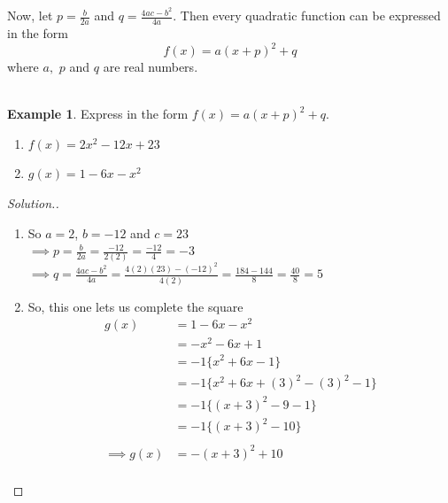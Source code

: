 \documentclass[11pt,a4paper]{article}
\theoremstyle{definition}
\newtheorem{example}[thm]{Example}
\newenvironment{solution}
  {\renewcommand{\qedsymbol}{}\begin{proof}[\textit{Solution}.]}
  {\end{proof}}
\begin{document}
Now, let $p=\frac{b}{2a}$ and $q=\frac{4ac-b^2}{4a}$. Then every quadratic function can be expressed in the form $$f(x)=a(x+p)^2+q$$ where $a,$ $p$ and $q$ are real numbers.\\\\

\begin{example}

Express in the form $f(x)=a(x+p)^2+q$.
\begin{enumerate}
\item $f(x)=2x^2-12x+23$
\item $g(x)=1-6x-x^2$\\
\end{enumerate}
\end{example}
\begin{solution}

\begin{enumerate}
\item So $a=2$, $b=-12$ and $c=23$\\

$\implies p=\frac{b}{2a}=\frac{-12}{2(2)}=\frac{-12}{4}=-3$\\

$\implies q=\frac{4ac-b^2}{4a}=\frac{4(2)(23)-(-12)^2}{4(2)}=\frac{184-144}{8}=\frac{40}{8}=5$\\

\item So, this one lets us complete the square
\begin{align*}
g(x) & = 1-6x-x^2\\
     & = -x^2-6x+1\\
     & = -1\{x^2+6x-1\}\\
     & = -1\{x^2+6x+(3)^2-(3)^2-1\}\\
     & = -1\{(x+3)^2-9-1\}\\
     & = -1\{(x+3)^2-10\}\\\\
\implies   g(x)  & = -(x+3)^2+10\\
\end{align*}
\end{enumerate}
\end{solution}
\end{document}
